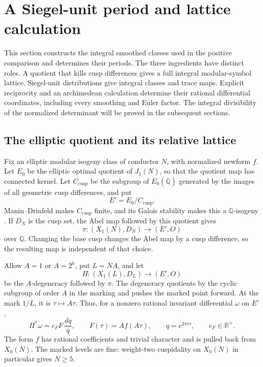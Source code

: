 \section{A Siegel-unit period and lattice calculation}\label{sec:siegel}

This section constructs the integral smoothed classes used in the positive
comparison and determines their periods.  The three ingredients have distinct
roles.  A quotient that kills cusp differences gives a full integral
modular-symbol lattice.  Siegel-unit distributions give integral classes and
trace maps.  Explicit reciprocity and an archimedean calculation determine
their rational differential coordinates, including every smoothing and Euler
factor.  The integral divisibility of the normalized determinant will be
proved in the subsequent sections.

\subsection{The elliptic quotient and its relative lattice}

Fix an elliptic modular isogeny class of conductor \(N\), with normalized
newform \(f\).  Let \(E_0\) be the elliptic optimal quotient of \(J_1(N)\), so
that the quotient map has connected kernel.  Let \(C_{\mathrm{cusp}}\) be the
subgroup of \(E_0(\overline{\mathbb Q})\) generated by the images of all
geometric cusp differences, and put
\[
                         E'=E_0/C_{\mathrm{cusp}}.
\]
Manin--Drinfeld makes \(C_{\mathrm{cusp}}\) finite, and its Galois stability
makes this a \(\mathbb Q\)-isogeny \cite{ManinDrinfeld}.  If \(D_N\) is the cusp
set, the Abel map followed by this quotient gives
\[
                  \pi:(X_1(N),D_N)\longrightarrow(E',O)
\]
over \(\mathbb Q\).  Changing the base cusp changes the Abel map by a cusp
difference, so the resulting map is independent of that choice.

Allow \(A=1\) or \(A=2^k\), put \(L=NA\), and let
\[
                  \Pi:(X_1(L),D_L)\longrightarrow(E',O)
\]
be the \(A\)-degeneracy followed by \(\pi\).  The degeneracy quotients by the
cyclic subgroup of order \(A\) in the marking and pushes the marked point
forward.  At the mark \(1/L\), it is \(\tau\mapsto A\tau\).  Thus, for a
nonzero rational invariant differential \(\omega\) on \(E'\),
\[
 \Pi^*\omega=c_F F\,\frac{dq}{q},
 \qquad F(\tau)=A f(A\tau),\qquad q=e^{2\pi i\tau},
 \qquad c_F\in\mathbb R^\times.
\]
The form \(f\) has rational coefficients and trivial character and is pulled
back from \(X_0(N)\).  The marked levels are fine: weight-two cuspidality on
\(X_0(N)\) in particular gives \(N\geq5\).

